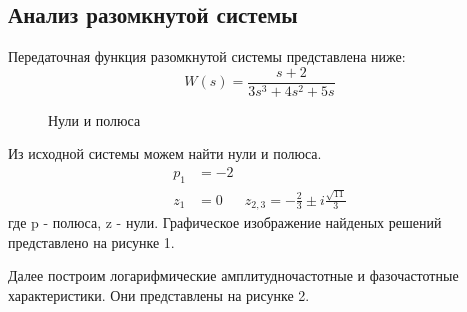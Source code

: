 \documentclass[a4paper, 12pt]{article}
\begin{document}
\newpage
\begin{center}
\section{Анализ разомкнутой системы}
\end{center}

Передаточная функция разомкнутой системы представлена ниже:
\begin{equation}
    W(s) = \frac{s + 2}{3s^3 + 4s^2 + 5s}
\end{equation}

\noindent
\begin{minipage}[t]{0.5\textwidth}
    \begin{figure} [H]
        \centering
        \caption{Нули и полюса}
    \end{figure}
\end{minipage}
\begin{minipage}[t]{0.5\textwidth}
    \vspace{0.5cm}
    Из исходной системы можем найти нули и полюса.
    \begin{align*}
        p_1 & = -2 \\
        z_1 & = 0 & z_{2, 3} = -\frac{2}{3} \pm i\frac{\sqrt{11}}{3}
    \end{align*}
    где p - полюса, z - нули. Графическое изображение найденых решений представлено на рисунке 1.
\end{minipage}
\vspace{0.5cm} \par

Далее построим логарифмические амплитудночастотные и фазочастотные характеристики. Они представлены на рисунке 2.
\end{document}
